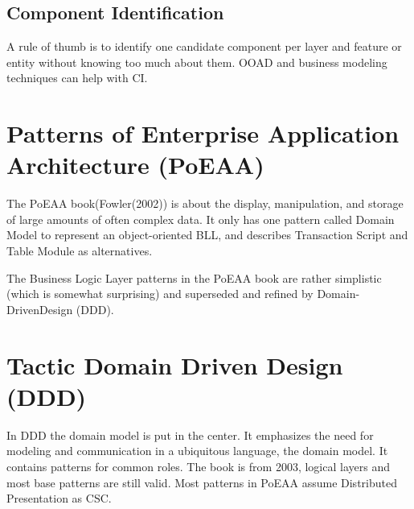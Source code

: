 \documentclass[../Main.tex]{subfiles}
\begin{document}
\subsection{Component Identification}
A rule of thumb is to identify one candidate component per layer and
feature or entity without knowing too much about them.
OOAD and business modeling techniques can help with CI.
\newpage

\section{Patterns of Enterprise Application Architecture (PoEAA)}
The PoEAA book(Fowler(2002)) is about the display, manipulation, and storage of large amounts of often complex data.
It only has one pattern called Domain Model to represent an object-oriented BLL,
and describes Transaction Script and Table Module as alternatives.

The Business Logic Layer patterns in the PoEAA book are rather simplistic (which is somewhat surprising) and
superseded and refined by Domain-DrivenDesign (DDD).

\section{Tactic Domain Driven Design (DDD)}
In DDD the domain model is put in the center. It emphasizes the need for
modeling and communication in a ubiquitous language, the domain model.
It contains patterns for common roles.
The book is from 2003, logical layers and most base patterns are still valid.
Most patterns in PoEAA assume Distributed Presentation as CSC.
\end{document}
